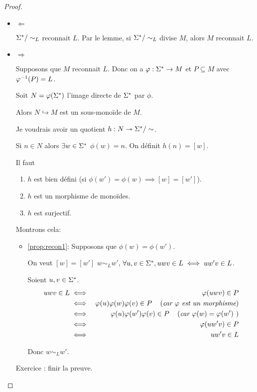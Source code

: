 \begin{proof}

	\begin{itemize}
		\item $\Leftarrow$

		      $\Sigma^{*} / \sim_L$ reconnait $L$. Par le lemme, si $\Sigma^{*} / \sim_L$ divise $M$, alors $M$ reconnait $L$.

		\item $\Rightarrow$

		      Supposons que $M$ reconnait $L$. Donc on a $\varphi : \Sigma^{*} \to M$ et $P \subseteq M$ avec $\varphi^{-1} (P) = L$.

		      Soit $N = \varphi (\Sigma^{*})$ l'image directe de $\Sigma^{*}$ par $\phi$.

		      Alors $N \hookrightarrow M$ est un sous-monoïde de $M$.

		      Je voudrais avoir un quotient $h : N \twoheadrightarrow \Sigma^{*}/\sim$.

		      Si $n \in N$ alors $\exists w \in \Sigma^{*}$ \tq $\phi(w) = n$. On définit $h(n) = [w]$.

		      Il faut \mq
		      \begin{enumerate}
			      \item $h$ est bien défini (si $\phi (w') = \phi (w) \implies [w] = [w']$). \label{prop:recon1}
			      \item $h$ est un morphisme de monoïdes.
			      \item $h$ est surjectif.
		      \end{enumerate}

		      Montrons cela:
		      \begin{itemize}
			      \item \ref{prop:recon1}: Supposons que $\phi(w) = \phi (w')$.

			            On veut \mq $[w]=[w']$ \cad $w \sim_L w'$, \cad $\forall u,v \in \Sigma^{*}, uwv \in L \iff uw'v \in L$.

			            Soient $u,v \in \Sigma^{*}$.
			            \begin{eqnarray*}
				            uwv \in L &\iff& \varphi (uwv) \in P\\
				            &\iff& \varphi (u)\varphi(w) \varphi(v) \in P \quad\left(\textit{car $\varphi$ est un morphisme}\right) \\
				            &\iff& \varphi (u)\varphi(w') \varphi(v) \in P \quad\left(\textit{car $\varphi (w) = \varphi (w')$ }\right) \\
				            &\iff& \varphi (uw'v) \in P\\
				            &\iff& uw'v \in L
			            \end{eqnarray*}

			            Donc $w \sim_L w'$.
		      \end{itemize}
		      Exercice : finir la preuve.
	\end{itemize}
\end{proof}
